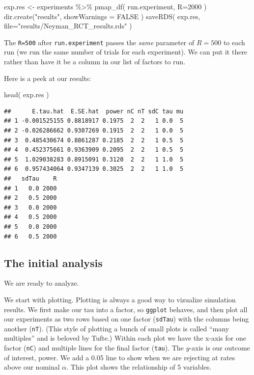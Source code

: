 \documentclass[
]{book}
\newenvironment{Shaded}{\begin{snugshade}}{\end{snugshade}}
\newcommand{\AttributeTok}[1]{\textcolor[rgb]{0.77,0.63,0.00}{#1}}
\newcommand{\ConstantTok}[1]{\textcolor[rgb]{0.00,0.00,0.00}{#1}}
\newcommand{\DecValTok}[1]{\textcolor[rgb]{0.00,0.00,0.81}{#1}}
\newcommand{\FunctionTok}[1]{\textcolor[rgb]{0.00,0.00,0.00}{#1}}
\newcommand{\NormalTok}[1]{#1}
\newcommand{\OtherTok}[1]{\textcolor[rgb]{0.56,0.35,0.01}{#1}}
\newcommand{\SpecialCharTok}[1]{\textcolor[rgb]{0.00,0.00,0.00}{#1}}
\newcommand{\StringTok}[1]{\textcolor[rgb]{0.31,0.60,0.02}{#1}}
\begin{document}
\begin{Shaded}
\begin{Highlighting}[]
\NormalTok{exp.res }\OtherTok{\textless{}{-}}\NormalTok{ experiments }\SpecialCharTok{\%\textgreater{}\%} \FunctionTok{pmap\_df}\NormalTok{( run.experiment, }\AttributeTok{R=}\DecValTok{2000}\NormalTok{ )}
\FunctionTok{dir.create}\NormalTok{(}\StringTok{"results"}\NormalTok{, }\AttributeTok{showWarnings =} \ConstantTok{FALSE}\NormalTok{ )}
\FunctionTok{saveRDS}\NormalTok{( exp.res, }\AttributeTok{file=}\StringTok{"results/Neyman\_RCT\_results.rds"}\NormalTok{ )}
\end{Highlighting}
\end{Shaded}

The \texttt{R=500} after \texttt{run.experiment} passes the \emph{same} parameter of \(R=500\) to each
run (we run the same number of trials for each experiment).
We can put it there rather than have it be a column in our list of factors to run.

Here is a peek at our results:

\begin{Shaded}
\begin{Highlighting}[]
\FunctionTok{head}\NormalTok{( exp.res )}
\end{Highlighting}
\end{Shaded}

\begin{verbatim}
##      E.tau.hat  E.SE.hat  power nC nT sdC tau mu
## 1 -0.001525155 0.8818917 0.1975  2  2   1 0.0  5
## 2 -0.026286662 0.9307269 0.1915  2  2   1 0.0  5
## 3  0.485430674 0.8861287 0.2185  2  2   1 0.5  5
## 4  0.452375661 0.9363909 0.2095  2  2   1 0.5  5
## 5  1.029038283 0.8915091 0.3120  2  2   1 1.0  5
## 6  0.957434064 0.9347139 0.3025  2  2   1 1.0  5
##   sdTau    R
## 1   0.0 2000
## 2   0.5 2000
## 3   0.0 2000
## 4   0.5 2000
## 5   0.0 2000
## 6   0.5 2000
\end{verbatim}

\hypertarget{the-initial-analysis}{%
\subsection{The initial analysis}\label{the-initial-analysis}}

We are ready to analyze.

We start with plotting.
Plotting is always a good way to vizualize simulation results.
We first make
our tau into a factor, so \texttt{ggplot} behaves, and then plot all our
experiments as two rows based on one factor (\texttt{sdTau}) with the columns being
another (\texttt{nT}). (This style of plotting a bunch of small plots is called
``many multiples'' and is beloved by Tufte.) Within each plot we have the
x-axis for one factor (\texttt{nC}) and multiple lines for the final factor (\texttt{tau}).
The \(y\)-axis is our outcome of interest, power. We add a 0.05 line to show
when we are rejecting at rates above our nominal \(\alpha\). This plot shows
the relationship of 5 variables.
\end{document}
